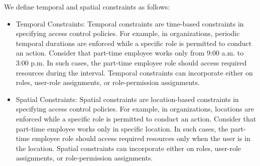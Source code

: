 We define temporal and spatial constraints as follows:

\begin{itemize}
	\item Temporal Constraints: Temporal constraints are time-based constraints in specifying access
	control policies. For example, in organizations, 	periodic temporal durations are enforced while a
	specific role is permitted to conduct an action. Consider that part-time employee works only from 9:00 a.m. to 3:00 p.m.
	In such cases, the part-time employee role should access required resources during the interval. 
	Temporal constraints can incorporate either on roles, user-role assignments, or role-permission assignments.   
	
	 
	\item Spatial Constraints: Spatial constraints are location-based constraints in specifying access
	control policies. For example, in organizations, 	locations are enforced while a
	specific role is permitted to conduct an action. Consider that part-time employee works only in specific location.
	In such cases, the part-time employee role should access required resources only when the user is in the location. 
	Spatial constraints can incorporate either on roles, user-role assignments, or role-permission assignments. 
	
\end{itemize}
